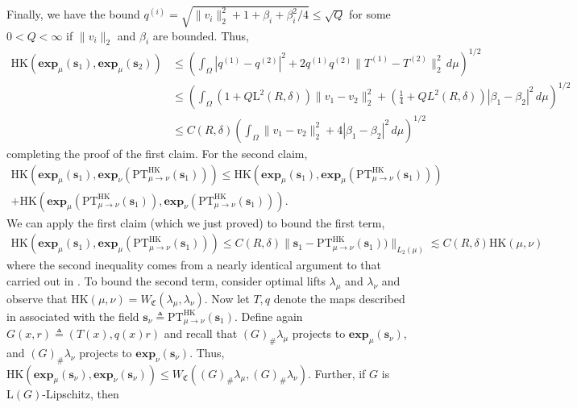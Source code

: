 \documentclass[11pt]{article}
\begin{document}
Finally, we have the bound $q^{(i)} = \sqrt{\|v_i\|_2^2 + 1 + \beta_i + \beta_i^2/4} \leq \sqrt{Q}$ for some $0 < Q < \infty$ if $\|v_i\|_2$ and $\beta_i$ are bounded. Thus,
\begin{align*}
    \text{HK}(\mathbf{exp}_{\mu}(\mathbf{s}_1), \mathbf{exp}_{\mu}(\mathbf{s}_2)) &\leq \left(\int_\Omega |q^{(1)} - q^{(2)}|^2 + 2q^{(1)}q^{(2)}\|T^{(1)} - T^{(2)}\|_2^2 \, d\mu\right)^{1/2} \\
    &\leq \left(\int_{\Omega}\left(1 + Q\text{L}^2(R, \delta)\right)\|v_1 - v_2\|_2^2 + \left(\frac{1}{4} + QL^2(R, \delta)\right)|\beta_1 - \beta_2|^2\, d\mu\right)^{1/2} \\
    &\leq C(R, \delta)\left(\int_\Omega \|v_1 - v_2\|_2^2 + 4|\beta_1 - \beta_2|^2 \, d\mu \right)^{1/2}
\end{align*}
completing the proof of the first claim. For the second claim,
\begin{multline*}
    \text{HK}(\mathbf{exp}_{\mu}(\mathbf{s}_1), \mathbf{exp}_{\nu}(\text{PT}^{\text{HK}}_{\mu \rightarrow \nu}(\mathbf{s}_1))) \leq \text{HK}(\mathbf{exp}_{\mu}(\mathbf{s}_1), \mathbf{exp}_{\mu}(\text{PT}^{\text{HK}}_{\mu \rightarrow \nu}(\mathbf{s}_1)))\\ + \text{HK}(\mathbf{exp}_{\mu}(\text{PT}^{\text{HK}}_{\mu \rightarrow \nu}(\mathbf{s}_1)), \mathbf{exp}_{\nu}(\text{PT}^{\text{HK}}_{\mu \rightarrow \nu}(\mathbf{s}_1))).
\end{multline*}
We can apply the first claim (which we just proved) to bound the first term,
\begin{align*}
    \text{HK}(\mathbf{exp}_{\mu}(\mathbf{s}_1), \mathbf{exp}_{\mu}(\text{PT}^{\text{HK}}_{\mu \rightarrow \nu}(\mathbf{s}_1))) \leq C(R, \delta)\|\mathbf{s}_1 - \text{PT}^{\text{HK}}_{\mu \rightarrow \nu}(\mathbf{s}_1))\|_{L_2(\mu)} \lesssim  C(R, \delta)\text{HK}(\mu, \nu)
\end{align*}
where the second inequality comes from a nearly identical argument to that carried out in . To bound the second term, consider optimal lifts $\lambda_\mu$ and $\lambda_\nu$ and observe that $\text{HK}(\mu, \nu) = W_\mathfrak{C}(\lambda_\mu, \lambda_\nu)$. Now let $T, q$ denote the maps described in  associated with the field $\mathbf{s}_\nu \triangleq \text{PT}^{\text{HK}}_{\mu \rightarrow \nu}(\mathbf{s}_1)$. Define again $G(x,r) \triangleq (T(x), q(x)r)$ and recall that $(G)_\#\lambda_\mu$ projects to $\mathbf{exp}_\mu(\mathbf{s}_\nu)$, and $(G)_\#\lambda_\nu$ projects to $\mathbf{exp}_\nu(\mathbf{s}_\nu)$. Thus, $\text{HK}(\mathbf{exp}_\mu(\mathbf{s}_\nu), \mathbf{exp}_\nu(\mathbf{s}_\nu)) \leq W_\mathfrak{C}((G)_\# \lambda_{\mu}, (G)_\#\lambda_\nu)$. Further, if $G$ is $\text{L}(G)$-Lipschitz, then 
\end{document}
